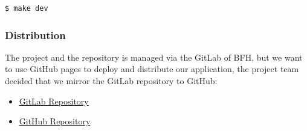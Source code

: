 \begin{lstlisting}[caption={Makefile: Start local webserver},label={lst:makefile_start_local_webserver},language=Bash]
$ make dev
\end{lstlisting}

\subsubsection{Distribution}
The project and the repository is managed via the GitLab of BFH,
but we want to use GitHub pages to deploy and distribute our application,
the project team decided that we mirror the GitLab repository to GitHub:
\begin{itemize}
    \item \href{https://gitlab.ti.bfh.ch/decibel-threshold-event-displayer/decibel-threshold-event-displayer}{GitLab Repository}
    \item \href{https://github.com/decibel-threshold-event-displayer/decibel-threshold-event-displayer.github.io}{GitHub Repository}
\end{itemize}

